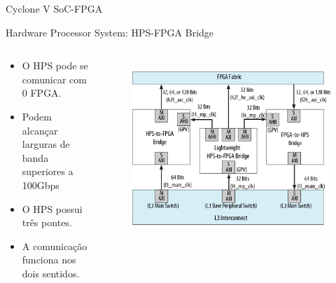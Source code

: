 \documentclass[10pt]{beamer}
\begin{document}
\begin{frame}{Cyclone V SoC-FPGA}
	\begin{alertblock}{Hardware Processor System: HPS-FPGA Bridge}
		\begin{columns}
			\begin{alertblock}{}
				\begin{itemize}
					\setlength\itemsep{0.8em}
					\item O HPS pode se comunicar com 0 FPGA.
					\item Podem alcançar larguras de banda superiores a 100Gbps
					\item O HPS possui três pontes.
					\item A comunicação funciona nos dois sentidos.
				\end{itemize}
			\end{alertblock}
			\begin{figure}[h]
				\begin{center}
					\includegraphics[scale=0.2]{imagens/hps-fpga_bridge.png}\\
				\end{center}
				\label{fig:bridge}
			\end{figure}
		\end{columns}
	\end{alertblock}
\end{frame}
\end{document}
